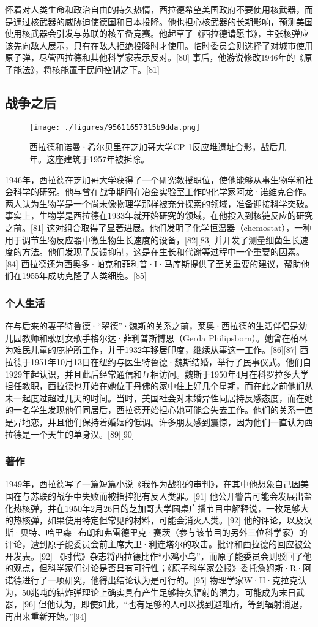 怀着对人类生命和政治自由的持久热情，西拉德希望美国政府不要使用核武器，而是通过核武器的威胁迫使德国和日本投降。他也担心核武器的长期影响，预测美国使用核武器会引发与苏联的核军备竞赛。他起草了《西拉德请愿书》，主张核弹应该先向敌人展示，只有在敌人拒绝投降时才使用。临时委员会则选择了对城市使用原子弹，尽管西拉德和其他科学家表示反对。[80] 事后，他游说修改1946年的《原子能法》，将核能置于民间控制之下。[81]
\subsection{战争之后}
\begin{figure}[ht]
\centering
\texttt{[image: ./figures/95611657315b9dda.png]}
\caption{西拉德和诺曼·希尔贝里在芝加哥大学CP-1反应堆遗址合影，战后几年。这座建筑于1957年被拆除。} \label{fig_Szilar_6}
\end{figure}
1946年，西拉德在芝加哥大学获得了一个研究教授职位，使他能够从事生物学和社会科学的研究。他与曾在战争期间在冶金实验室工作的化学家阿龙·诺维克合作。两人认为生物学是一个尚未像物理学那样被充分探索的领域，准备迎接科学突破。事实上，生物学是西拉德在1933年就开始研究的领域，在他投入到核链反应的研究之前。[81] 这对组合取得了显著进展。他们发明了化学恒温器（chemostat），一种用于调节生物反应器中微生物生长速度的设备，[82][83] 并开发了测量细菌生长速度的方法。他们发现了反馈抑制，这是在生长和代谢等过程中一个重要的因素。[84] 西拉德还为西奥多·帕克和菲利普·I·马库斯提供了至关重要的建议，帮助他们在1955年成功克隆了人类细胞。[85]
\subsubsection{个人生活}  
在与后来的妻子特鲁德·“翠德”·魏斯的关系之前，莱奥·西拉德的生活伴侣是幼儿园教师和歌剧女歌手格尔达·菲利普斯博恩（Gerda Philipsborn）。她曾在柏林为难民儿童的庇护所工作，并于1932年移居印度，继续从事这一工作。[86][87] 西拉德于1951年10月13日在纽约与医生特鲁德·魏斯结婚，举行了民事仪式。他们自1929年起认识，并且此后经常通信和互相访问。魏斯于1950年4月在科罗拉多大学担任教职，西拉德也开始在她位于丹佛的家中住上好几个星期，而在此之前他们从未一起度过超过几天的时间。当时，美国社会对未婚异性同居持反感态度，而在她的一名学生发现他们同居后，西拉德开始担心她可能会失去工作。他们的关系一直是异地恋，并且他们保持着婚姻的低调。许多朋友感到震惊，因为他们一直认为西拉德是一个天生的单身汉。[89][90]
\subsubsection{著作}  
1949年，西拉德写了一篇短篇小说《我作为战犯的审判》，在其中他想象自己因美国在与苏联的战争中失败而被指控犯有反人类罪。[91] 他公开警告可能会发展出盐化热核弹，并在1950年2月26日的芝加哥大学圆桌广播节目中解释说，一枚足够大的热核弹，如果使用特定但常见的材料，可能会消灭人类。[92] 他的评论，以及汉斯·贝特、哈里森·布朗和弗雷德里克·赛茨（参与该节目的另外三位科学家）的评论，遭到原子能委员会前主席大卫·利连塔尔的攻击。批评和西拉德的回应被公开发表。[92] 《时代》杂志将西拉德比作“小鸡小鸟”，而原子能委员会则驳回了他的观点，但科学家们讨论是否具有可行性；《原子科学家公报》委托詹姆斯·R·阿诺德进行了一项研究，他得出结论认为是可行的。[95] 物理学家W·H·克拉克认为，50兆吨的钴炸弹理论上确实具有产生足够持久辐射的潜力，可能成为末日武器，[96] 但他认为，即使如此，“也有足够的人可以找到避难所，等到辐射消退，再出来重新开始。”[94]

